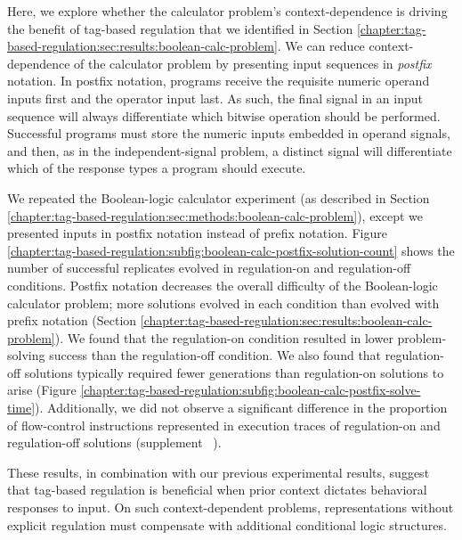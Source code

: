 Here, we explore whether the calculator problem's context-dependence is driving the benefit of tag-based regulation that we identified in Section \ref{chapter:tag-based-regulation:sec:results:boolean-calc-problem}.
We can reduce context-dependence of the calculator problem by presenting input sequences in \textit{postfix} notation. 
In postfix notation, programs receive the requisite numeric operand inputs first and the operator input last. 
As such, the final signal in an input sequence will always differentiate which bitwise operation should be performed.
Successful programs must store the numeric inputs embedded in operand signals, and then, as in the independent-signal problem, a distinct signal will differentiate which of the response types a program should execute. 



We repeated the Boolean-logic calculator experiment (as described in Section \ref{chapter:tag-based-regulation:sec:methods:boolean-calc-problem}), except we presented inputs in postfix notation instead of prefix notation. 
Figure \ref{chapter:tag-based-regulation:subfig:boolean-calc-postfix-solution-count} shows the number of successful replicates evolved in regulation-on and regulation-off conditions.
Postfix notation decreases the overall difficulty of the Boolean-logic calculator problem; more solutions evolved in each condition than evolved with prefix notation (Section \ref{chapter:tag-based-regulation:sec:results:boolean-calc-problem}).
We found that the regulation-on condition resulted in lower problem-solving success than the regulation-off condition. 
We also found that regulation-off solutions typically required fewer generations than regulation-on solutions to arise (Figure \ref{chapter:tag-based-regulation:subfig:boolean-calc-postfix-solve-time}).
Additionally, we did not observe a significant difference in the proportion of flow-control instructions represented in execution traces of regulation-on and regulation-off solutions (supplement \supSecBooleanCalcPostfixAnalysis\ \citep{tag_regulation_supplement_2021}). 

These results, in combination with our previous experimental results, suggest that tag-based regulation is beneficial when prior context dictates behavioral responses to input.
On such context-dependent problems, representations without explicit regulation must compensate with additional conditional logic structures. 


